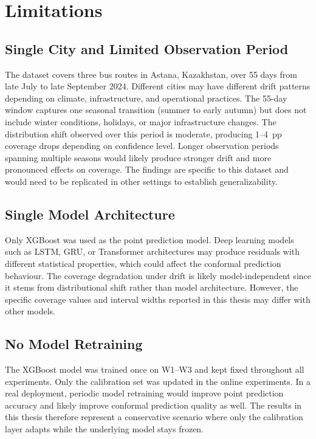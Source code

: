 \documentclass[12pt, a4paper, oneside]{report}
\begin{document}
\section{Limitations}
\label{sec:limitations}

\subsection{Single City and Limited Observation Period}

The dataset covers three bus routes in Astana, Kazakhstan, over 55 days from late July to late September 2024. Different cities may have different drift patterns depending on climate, infrastructure, and operational practices. The 55-day window captures one seasonal transition (summer to early autumn) but does not include winter conditions, holidays, or major infrastructure changes. The distribution shift observed over this period is moderate, producing 1--4~pp coverage drops depending on confidence level. Longer observation periods spanning multiple seasons would likely produce stronger drift and more pronounced effects on coverage. The findings are specific to this dataset and would need to be replicated in other settings to establish generalizability.

\subsection{Single Model Architecture}

Only XGBoost was used as the point prediction model. Deep learning models such as LSTM, GRU, or Transformer architectures may produce residuals with different statistical properties, which could affect the conformal prediction behaviour. The coverage degradation under drift is likely model-independent since it stems from distributional shift rather than model architecture. However, the specific coverage values and interval widths reported in this thesis may differ with other models.

\subsection{No Model Retraining}

The XGBoost model was trained once on W1--W3 and kept fixed throughout all experiments. Only the calibration set was updated in the online experiments. In a real deployment, periodic model retraining would improve point prediction accuracy and likely improve conformal prediction quality as well. The results in this thesis therefore represent a conservative scenario where only the calibration layer adapts while the underlying model stays frozen.
\end{document}
